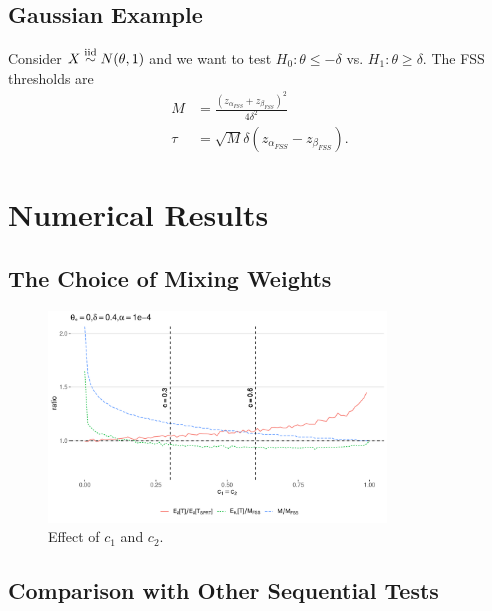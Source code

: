 \documentclass[11pt]{article}
\begin{document}
\subsection{Gaussian Example}
Consider $X \overset{\text{iid}}\sim N(\theta, 1)$ and we want to test $H_0 : \theta \leq -\delta$ vs. $H_1 : \theta \geq \delta$. The FSS thresholds are
\begin{equation}
\begin{split}
M &= \frac{(z_{\alpha_{FSS}} + z_{\beta_{FSS}})^2}{4 \delta^2} \\
\tau &= \sqrt{M} \delta (z_{\alpha_{FSS}} - z_{\beta_{FSS}}).
\end{split}
\end{equation}

\section{Numerical Results}

\subsection{The Choice of Mixing Weights}\label{sec:mixing_weights}

\begin{figure}
\centering
\includegraphics[width=0.8\textwidth]{images/c1_c2_ratios}
\caption{Effect of $c_1$ and $c_2$.}
\end{figure}

\subsection{Comparison with Other Sequential Tests}\label{sec:comparisons}
\end{document}

